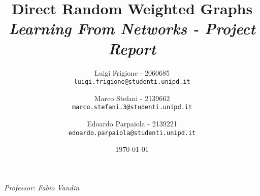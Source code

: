 \title{
    \textbf{Direct Random Weighted Graphs}\\[.5cm]
    
    {\large\emph{Learning From Networks - Project Report}}
}

\author{
  Luigi Frigione - 2060685\\
  \texttt{\small{luigi.frigione@studenti.unipd.it}}
  \and
  Marco Stefani - 2139662\\
  \texttt{\small{marco.stefani.3@studenti.unipd.it}}
  \and
  Edoardo Parpaiola - 2139221\\
  \texttt{\small{edoardo.parpaiola@studenti.unipd.it}}
}

\date{\today}

\maketitle

\vfill
{
    \emph{Professor: Fabio Vandin}
}